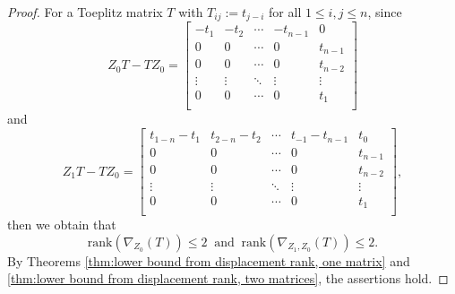 \documentclass[reqno]{amsart}
\theoremstyle{definition}
\newcommand{\rank}{\mathrm{rank}}
\numberwithin{equation}{section}
\begin{document}
\begin{proof}
    For a Toeplitz matrix $T$ with $T_{ij}:=t_{j-i}$ for all $1 \le i,j \leq n$, since
    \begin{equation*}
        Z_0T-TZ_0=\begin{bmatrix}
            -t_1 & -t_2 & \cdots & -t_{n-1} & 0\\
            0 & 0 & \cdots & 0 & t_{n-1}\\
            0 & 0 & \cdots & 0 & t_{n-2}\\
            \vdots & \vdots &\ddots & \vdots & \vdots\\
            0 & 0 & \cdots & 0 & t_{1}\\
        \end{bmatrix}
    \end{equation*}
    and 
    \begin{equation*}
        Z_1T-TZ_0=\begin{bmatrix}
            t_{1-n}-t_{1} & t_{2-n}-t_2 & \cdots & t_{-1}-t_{n-1} & t_0\\
            0 & 0 & \cdots & 0 & t_{n-1}\\
            0 & 0 & \cdots & 0 & t_{n-2}\\
            \vdots & \vdots &\ddots & \vdots & \vdots\\
            0 & 0 & \cdots & 0 & t_{1}\\
        \end{bmatrix},
    \end{equation*}
    then we obtain that
    \begin{equation*}
        \rank(\nabla_{Z_0}(T)) \leq 2~\text{ and }~\rank(\nabla_{Z_1,Z_0}(T)) \leq 2.
    \end{equation*}
    By Theorems \ref{thm:lower bound from displacement rank, one matrix} and \ref{thm:lower bound from displacement rank, two matrices}, the assertions hold.
\end{proof}
\end{document}
